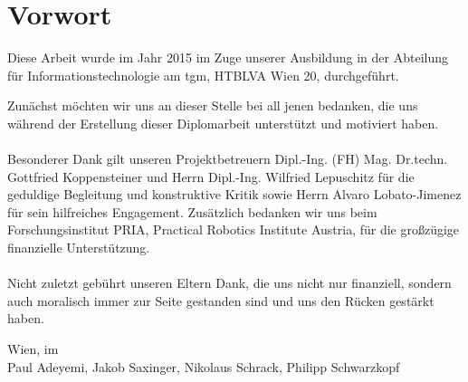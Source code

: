 

\chapter*{Vorwort}

Diese Arbeit wurde im Jahr 2015 im Zuge unserer Ausbildung in der Abteilung für Informationstechnologie am \gls{tgm}, HTBLVA Wien 20, durchgeführt. 


\bigskip

Zunächst möchten wir uns an dieser Stelle bei all jenen bedanken, die uns während der Erstellung dieser Diplomarbeit unterstützt und motiviert haben. \\\\
Besonderer Dank gilt unseren Projektbetreuern Dipl.-Ing. (FH) Mag. Dr.techn. Gottfried Koppensteiner und Herrn Dipl.-Ing. Wilfried Lepuschitz für die geduldige Begleitung und konstruktive Kritik sowie Herrn Alvaro Lobato-Jimenez für sein hilfreiches Engagement.
Zusätzlich bedanken wir uns beim Forschungsinstitut PRIA, Practical Robotics Institute Austria, für die großzügige finanzielle Unterstützung.\\\\
Nicht zuletzt gebührt unseren Eltern Dank, die uns nicht nur finanziell, sondern auch moralisch immer zur Seite gestanden sind und uns den Rücken gestärkt haben.
\bigskip
\bigskip
\bigskip



Wien, im \monthdis \\ 
\hfill Paul Adeyemi, Jakob Saxinger, Nikolaus Schrack, Philipp Schwarzkopf \vfill
